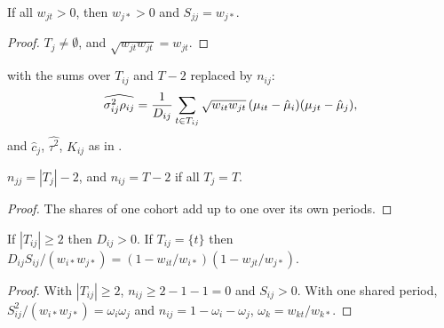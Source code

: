 \begin{lemma}\label{lem:U_wtot_pos}
  \leanok
  If all $w_{jt} > 0$, then $w_{j*} > 0$ and $S_{jj} = w_{j*}$.
\end{lemma}
\begin{proof}
  \leanok
  $T_j \ne \emptyset$, and $\sqrt{w_{jt}w_{jt}} = w_{jt}$.
\end{proof}

\begin{definition}[Estimators]\label{def:U_estimators}
  \leanok
   with the sums over $T_{ij}$ and $T - 2$ replaced by $n_{ij}$:
  \[
    \widehat{\sigma^2_{ij}\rho_{ij}} = \frac{1}{D_{ij}}\sum_{t \in T_{ij}}
      \sqrt{w_{it}w_{jt}}\,(\mu_{it}-\hat\mu_i)(\mu_{jt}-\hat\mu_j),
  \]
  and $\hat c_j$, $\widehat{\tau^2}$, $\hat K_{ij}$ as in .
\end{definition}

\begin{lemma}\label{lem:U_count}
  \leanok
  $n_{jj} = |T_j| - 2$, and $n_{ij} = T - 2$ if all $T_j = T$.
\end{lemma}
\begin{proof}
  \leanok
  The shares of one cohort add up to one over its own periods.
\end{proof}

\begin{lemma}[When $D_{ij} > 0$]\label{lem:U_den}
  \leanok
  If $|T_{ij}| \ge 2$ then $D_{ij} > 0$. If $T_{ij} = \{t\}$ then
  $D_{ij}S_{ij}/(w_{i*}w_{j*}) = (1 - w_{it}/w_{i*})(1 - w_{jt}/w_{j*})$.
\end{lemma}
\begin{proof}
  \leanok
  With $|T_{ij}| \ge 2$, $n_{ij} \ge 2 - 1 - 1 = 0$ and $S_{ij} > 0$. With one
  shared period, $S_{ij}^2/(w_{i*}w_{j*}) = \omega_i\omega_j$ and
  $n_{ij} = 1 - \omega_i - \omega_j$, $\omega_k = w_{kt}/w_{k*}$.
\end{proof}

